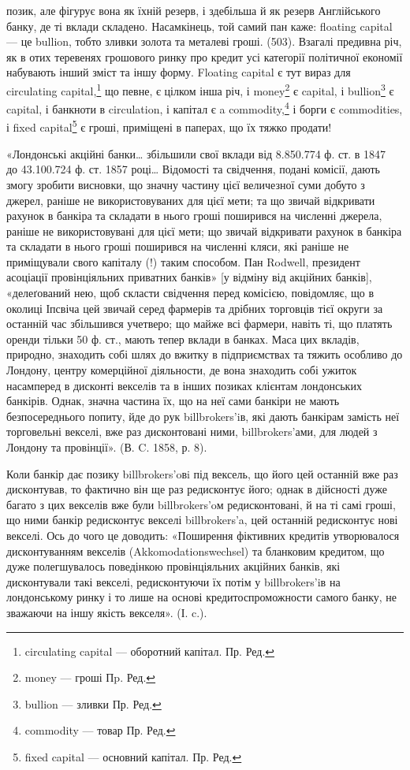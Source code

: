 \parcont{}  %
позик, але фігурує вона як їхній резерв, і здебільша й як резерв Англійського
банку, де ті вклади складено. Насамкінець, той самий пан каже: floating
capital — це bullion, тобто зливки золота та металеві гроші. (503). Взагалі предивна
річ, як в отих теревенях грошового ринку про кредит усі категорії політичної
економії набувають інший зміст та іншу форму. Floating capital є тут
вираз для circulating capital,\footnote*{
circulating capital — оборотний капітал. Пр. Ред.
} що певне, є цілком інша річ, і money\footnote*{
money — гроші Пp. Ред.
} є capital,
і bullion\footnote*{
bullion — зливки Пр. Ред.
} є capital, і банкноти в circulation, і капітал є a commodity,\footnote*{
commodity — товар Пр. Ред.
} і борги є
commodities, і fixed capital\footnote*{
fixed capital — основний капітал. Пр. Ред.
} є гроші, приміщені в паперах, що їх тяжко продати!

«Лондонські акційні банки\dots{} збільшили свої вклади від \num{8.850.774} ф. ст.
в 1847~ до \num{43.100.724} ф. ст. 1857 році\dots{} Відомості та свідчення, подані
комісії, дають змогу зробити висновки, що значну частину цієї величезної суми
добуто з джерел, раніше не використовуваних для цієї мети; та що звичай відкривати
рахунок в банкіра та складати в нього гроші поширився на численні
джерела, раніше не використовувані для цієї мети; що звичай відкривати рахунок
в банкіра та складати в нього гроші поширився на численні кляси, які
раніше не приміщували свого капіталу (!) таким способом. Пан Rodwell, президент
асоціації провінціяльних приватних банків» [у відміну від акційних
банків], «делеґований нею, щоб скласти свідчення перед комісією, повідомляє,
що в околиці Іпсвіча цей звичай серед фармерів та дрібних торговців тієї
округи за останній час збільшився учетверо; що майже всі фармери, навіть ті,
що платять оренди тільки 50 ф. ст., мають тепер вклади в банках. Маса
цих вкладів, природно, знаходить собі шлях до вжитку в підприємствах та
тяжить особливо до Лондону, центру комерційної діяльности, де вона знаходить
собі ужиток насамперед в дисконті векселів та в інших позиках клієнтам лондонських
банкірів. Однак, значна частина їх, що на неї сами банкіри не мають
безпосереднього попиту, йде до рук billbrokers’iв, які дають банкірам замість
неї торговельні векселі, вже раз дисконтовані ними, billbrokers’ами, для людей
з Лондону та провінції». (В. C. 1858, р. 8).

Коли банкір дає позику billbrokers’oвi під вексель, що його цей останній
вже раз дисконтував, то фактично він ще раз редисконтує його; однак в дійсності
дуже багато з цих векселів вже були billbrokers’oм редисконтовані, й на
ті самі гроші, що ними банкір редисконтує векселі billbrokers’a, цей останній
редисконтує нові векселі. Ось до чого це доводить: «Поширення фіктивних кредитів
утворювалося дисконтуванням векселів (Akkomodationswechsel) та бланковим
кредитом, що дуже полегшувалось поведінкою провінціяльних акційних банків,
які дисконтували такі векселі, редисконтуючи їх потім у billbrokers’iв на лондонському
ринку і то лише на основі кредитоспроможности самого банку, не
зважаючи на іншу якість векселя». (І. c.).

